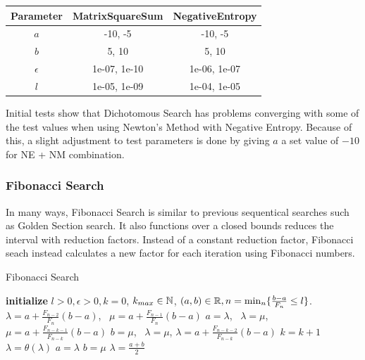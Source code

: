 \documentclass[a4paper,english,titlepage,12pt]{article}
\newcommand{\R}{\ensuremath\mathbb{R}}
\newcommand{\N}{\ensuremath\mathbb{N}}
\begin{document}
\begin{table}[H]
\label{tab:params_DichotomousSearch}
\centering
{}
\begin{tabular}{|c|c|c|}
\hline
\rowcolor{gray!25}
Parameter & MatrixSquareSum & NegativeEntropy \\
\hline
$a$ & -10, -5 & -10, -5 \\
$b$ & 5, 10 & 5, 10 \\
$\epsilon$ & 1e-07, 1e-10 & 1e-06, 1e-07 \\
$l$ & 1e-05, 1e-09 & 1e-04, 1e-05 \\
\hline
\end{tabular}
\end{table}

Initial tests show that Dichotomous Search has problems converging with some of the test values when using Newton's Method with Negative Entropy. Because of this, a slight adjustment to test parameters is done by giving $a$ a set value of $-10$ for NE + NM combination.


\subsubsection{Fibonacci Search}

In many ways, Fibonacci Search is similar to previous sequentical searches such as Golden Section search. It also functions over a closed bounds reduces the interval with reduction factors. Instead of a constant reduction factor, Fibonacci seach instead calculates a new factor for each iteration using Fibonacci numbers. \cite{book:nonlinear_programming}

\begin{algorithm}[H]
\caption{Fibonacci Search}
\label{alg_fibonacci}
\begin{algorithmic}[1]
\STATE \textbf{initialize} $l > 0, \epsilon > 0, k = 0$, $k_{max} \in \N$, $(a, b) \in \R, n = \mathrm{min}_n \{ \frac{b - a}{F_n} \leq l \}$.
\STATE $\lambda = a + \frac{F_{n-2}}{F_n} (b - a)$, \  $\mu = a + \frac{F_{n-1}}{F_n} (b - a)$
    \IF{$\theta(\lambda) < \theta(\mu)$}
        \STATE $a = \lambda$, \ $\lambda = \mu$, $\mu = a + \frac{F_{n-k-1}}{F_{n-k}} (b - a)$
    \ELSE
        \STATE $b = \mu$, \ $\lambda = \mu$, $\lambda = a + \frac{F_{n-k-2}}{F_{n-k}} (b - a)$
    \ENDIF
    \STATE $k = k + 1$
\ENDWHILE
\STATE $\lambda = \theta(\lambda)$
\IF{$\theta(\lambda) > \theta(\mu + \epsilon)$}
    \STATE $a = \lambda$
\ELSE
    \STATE $b = \mu$
\ENDIF
\RETURN $\lambda = \frac{a + b}{2}$
\end{algorithmic}
\end{algorithm}
\end{document}
